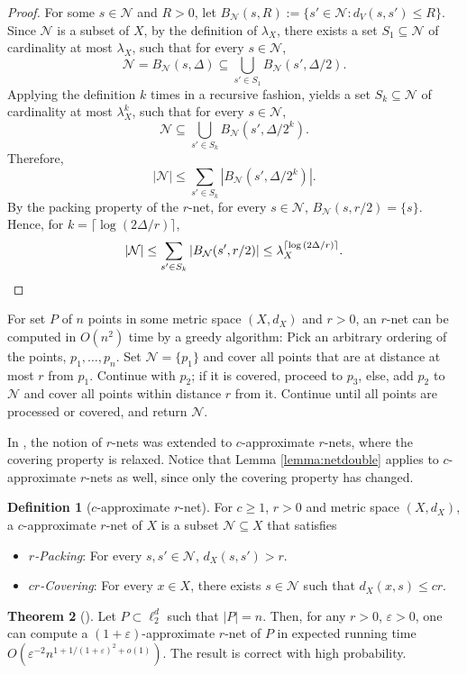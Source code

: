 \documentclass[10pt,a4paper,twoside]{book}
\newcommand{\eps}{\varepsilon}
\newcommand{\net}{\mathcal{N}}
\theoremstyle{definition}
\newtheorem{definition}{Definition}[chapter]
\newtheorem{theorem}[definition]{Theorem}
\theoremstyle{remark}
\begin{document}
\begin{proof}
For some $s \in \net$ and $R>0$, let $B_{\net}(s,R) := \{s' \in \net: d_V(s,s') \leq R\}$. Since $\net$ is a subset of $X$, by the definition of $\lambda_X$, there exists a set $S_1 \subseteq \net$ of cardinality at most $\lambda_X$, such that for every $s \in \net$,
\[  \net = B_{\net}(s, \Delta) \subseteq \bigcup_{s' \in S_1} B_{\net}(s', \Delta/2).\]
Applying the definition $k$ times in a recursive fashion, yields a set $S_k \subseteq \net$ of cardinality at most $\lambda_X^k$, such that for every $s \in \net$,
\[  \net \subseteq \bigcup_{s' \in S_k} B_{\net}(s', \Delta/2^k).\]
Therefore,
\[  |\net| \leq \sum_{s' \in S_k} |B_{\net}(s', \Delta/2^k)|.\]
By the packing property of the $r$-net, for every $s \in \net$, $B_{\net}(s,r/2) = \{s\}$.
Hence, for $k = \lceil \log{(2\Delta/ r)} \rceil$,
\[  |\net| \leq \sum_{s' \in S_k} |B_{\net}(s', r/2)| \leq \lambda_X^{\lceil \log{(2\Delta/ r)} \rceil}. \qedhere\]
\end{proof}

For set $P$ of $n$ points in some metric space $(X, d_X)$ and $r>0$, an $r$-net can be computed in $O(n^2)$ time by a greedy algorithm: Pick an arbitrary ordering of the points, $p_1, \ldots, p_n$. Set $\net = \{p_1\}$ and cover all points that are at distance at most $r$ from $p_1$. Continue with $p_2$; if it is covered, proceed to $p_3$, else, add $p_2$ to $\net$ and cover all points within distance $r$ from it. Continue until all points are processed or covered, and return $\net$. 

In \cite{EHS15}, the notion of $r$-nets was extended to $c$-approximate $r$-nets, where the covering property is relaxed. Notice that Lemma \ref{lemma:netdouble} applies to $c$-approximate $r$-nets as well, since only the covering property has changed.
\begin{definition} [$c$-approximate $r$-net]
For $c \geq 1$, $r >0$ and metric space $(X,d_X)$, a $c$-approximate $r$-net of $X$ is a subset $\net \subseteq X$ that satisfies
\begin{itemize} \itemsep0em
    \item {\em $r$-Packing}: For every $s, s' \in \net$, $d_X(s,s') > r$.
    \item {\em $cr$-Covering}: For every $x \in X$, there exists $s \in \net$ such that $d_X(x,s) \leq cr$. 
\end{itemize}
\end{definition}

\begin{theorem} [\cite{EHS15}] \label{theorem:apprnetsl2} 
Let $P\subset \ell_2^d$ such that $|P|=n$. Then, for any $r>0$, $\eps>0$, one can compute a $(1+ \eps)$-approximate $r$-net of $P$ in expected running time $O(\eps^{-2}n^{1+1/(1+\eps)^2+o(1)})$. The result is correct with high probability.
\end{theorem}
\end{document}
